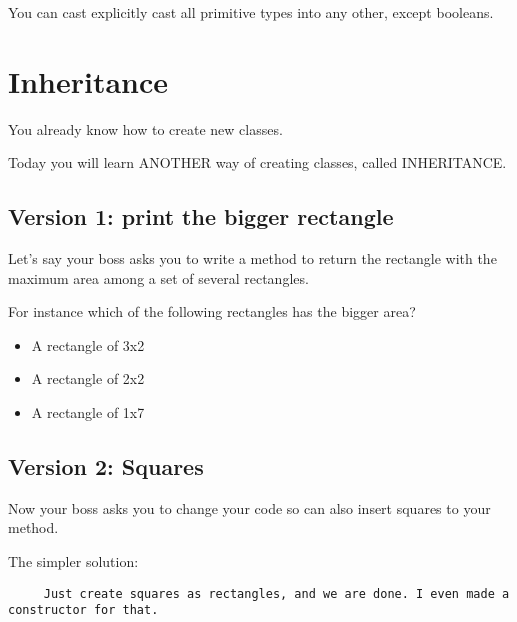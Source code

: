 \documentclass[a4paper, 9pt]{extarticle}
\begin{document}
You can cast explicitly cast all primitive types into any other, except
booleans.












\section{Inheritance}

You already know how to create new classes.

Today you will learn ANOTHER way of creating classes, called INHERITANCE.

\subsection{Version 1: print the bigger rectangle}

Let's say your boss asks you to write a method to return the rectangle with the
maximum area among a set of several rectangles.

For instance which of the following rectangles has the bigger area?

\begin{itemize}
  \item A rectangle of 3x2
  \item A rectangle of 2x2
  \item A rectangle of 1x7
\end{itemize}

\begin{multicols}{2}
\columnbreak
\end{multicols}


\subsection{Version 2: Squares}

Now your boss asks you to change your code so can also insert squares to your
method.

The simpler solution:

\verb+     Just create squares as rectangles, and we are done. I even made a constructor for that.+
\end{document}
